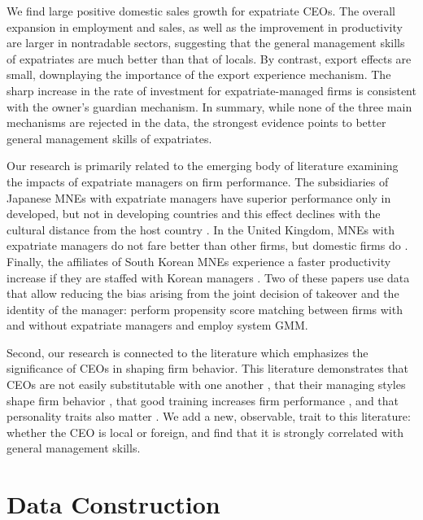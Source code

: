 \documentclass[12pt,a4paper]{article}
\begin{document}
We find large positive domestic sales growth for expatriate CEOs. The overall expansion in employment and sales, as well as the improvement in productivity are larger in nontradable sectors, suggesting that the general management skills of expatriates are much better than that of locals. By contrast, export effects are small, downplaying the importance of the export experience mechanism. The sharp increase in the rate of investment for expatriate-managed firms is consistent with the owner's guardian mechanism. In summary, while none of the three main mechanisms are rejected in the data, the strongest evidence points to better general management skills of expatriates.

Our research is primarily related to the emerging body of literature examining the impacts of expatriate managers on firm performance. The subsidiaries of Japanese MNEs with expatriate managers have superior performance only in developed, but not in developing countries \citep{ando2014effect} and this effect declines with the cultural distance from the host country \citep{gong2003subsidiary}. In the United Kingdom,  MNEs with expatriate managers do not fare better than other firms, but domestic firms do \citep{exadaktylos2024talents}. Finally, the affiliates of South Korean MNEs experience a faster productivity increase if they are staffed with Korean managers \citep{cho2018knowledge}. Two of these papers use data that allow reducing the bias arising from the joint decision of takeover and the identity of the manager: \cite{exadaktylos2024talents} perform propensity score matching between firms with and without expatriate managers and \cite{cho2018knowledge} employ system GMM.

Second, our research is connected to the literature which emphasizes the significance of CEOs in shaping firm behavior. This literature demonstrates that CEOs are not easily substitutable with one another \citep{bennedsen2020ceos, huber2021discrimination}, that their managing styles shape firm behavior \citep{bandiera2020ceo}, that good training increases firm performance \citep{Bloom2012-ek,giorcelli2019long}, and that personality traits also matter \citep{kaplan2022ceo}. We add a new, observable, trait to this literature: whether the CEO is local or foreign, and find that it is strongly correlated with general management skills.


\section{Data Construction}\label{sec: data}
\end{document}
